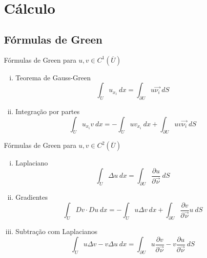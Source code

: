 \documentclass[11pt]{article}
\newcommand{\qed}{$\hfill\square$}
\begin{document}
%


\section{Cálculo}

\subsection{Fórmulas de Green}

Fórmulas de Green para \( u,v \in C^1(\overline{U}) \)

\begin{enumerate}[(i)]
	\item Teorema de Gauss-Green \[ \int_U u_{x_i}\ dx = \int_{\partial U} u \vec{\nu_i}\ dS \]
	\item Integração por partes \[ \int_U u_{x_i} v\ dx = - \int_U u v_{x_i}\ dx + \int_{\partial U} u v \vec{\nu_i}\ dS \]
\end{enumerate}

Fórmulas de Green para \( u,v \in C^2 (\overline{U}) \)
\begin{enumerate}[(i)]
	\item Laplaciano \[ \int_U \Delta u\ dx = \int_{\partial U} \frac{\partial u}{\partial \vec{\nu}} \ dS \]
	
	\item Gradientes \[ \int_U Dv \cdot Du \ dx = -\int_U u \Delta v\ dx + \int_{\partial U} \frac{\partial v}{\partial \vec{\nu}} u \ dS \]
	
	\item Subtração com Laplacianos \[\int_U u \Delta v - v \Delta u\ dx = \int_{\partial U} u \frac{\partial v}{\partial \vec{\nu}} - v \frac{\partial u}{\partial \vec{\nu}}\ dS \]
\end{enumerate}
\end{document}
